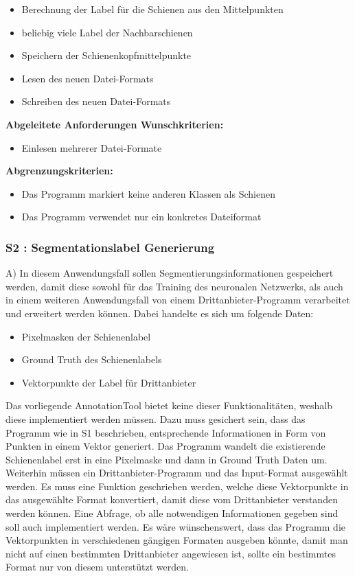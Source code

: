 \documentclass[11pt]{scrartcl}
\begin{document}
\begin{itemize}
	\item Berechnung der Label für die Schienen aus den Mittelpunkten
	\item beliebig viele Label der Nachbarschienen
	\item Speichern der Schienenkopfmittelpunkte
	\item Lesen des neuen Datei-Formats 
	\item Schreiben des neuen Datei-Formats
\end{itemize}
\textbf{Abgeleitete Anforderungen Wunschkriterien:}
\begin{itemize}
	\item Einlesen mehrerer Datei-Formate 
\end{itemize}
\textbf{Abgrenzungskriterien:}

\begin{itemize}
	\item Das Programm markiert keine anderen Klassen als Schienen 
	\item Das Programm verwendet nur ein konkretes Dateiformat
\end{itemize}

\noindent
\subsubsection{S2 : Segmentationslabel Generierung} 
\label{sec:S2 : Segmentationslabel Generierung}
A)
\noindent
In diesem Anwendungsfall sollen Segmentierungsinformationen gespeichert werden, damit diese sowohl für das Training des neuronalen Netzwerks, als auch in einem weiteren Anwendungsfall von einem Drittanbieter-Programm verarbeitet und erweitert werden können. Dabei handelte es sich um folgende Daten:
\begin{itemize}
	\item Pixelmasken der Schienenlabel
	\item Ground Truth des Schienenlabels
	\item Vektorpunkte der Label für Drittanbieter
\end{itemize}
\noindent
Das vorliegende AnnotationTool bietet keine dieser Funktionalitäten, weshalb diese implementiert werden müssen. Dazu muss gesichert sein, dass das Programm wie in S1 beschrieben, entsprechende Informationen in Form von Punkten in einem Vektor generiert. Das Programm wandelt die existierende Schienenlabel erst in eine Pixelmaske und dann in Ground Truth Daten um. 
Weiterhin müssen ein Drittanbieter-Programm und das Input-Format ausgewählt werden. Es muss eine Funktion geschrieben werden, welche diese Vektorpunkte in das ausgewählte Format konvertiert, damit diese vom Drittanbieter verstanden werden können. Eine Abfrage, ob alle notwendigen Informationen gegeben sind soll auch implementiert werden. Es wäre wünschenswert, dass das Programm die Vektorpunkten in verschiedenen gängigen Formaten ausgeben könnte, damit man nicht auf einen bestimmten Drittanbieter angewiesen ist, sollte ein bestimmtes Format nur von diesem unterstützt werden.
\\
\end{document}
